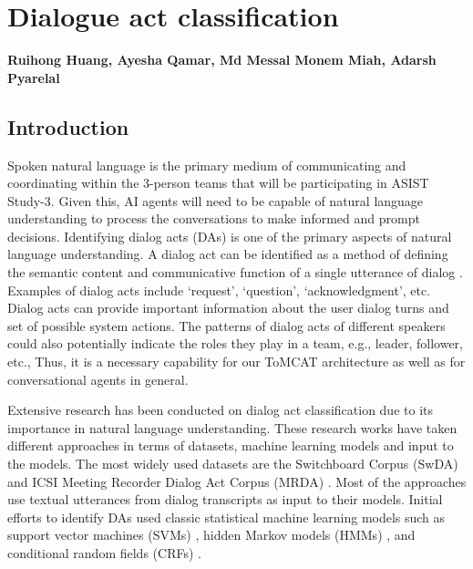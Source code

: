 \chapter{Dialogue act classification}
\label{ch:da_classification}
\textbf{Ruihong Huang, Ayesha Qamar, Md Messal Monem Miah, Adarsh Pyarelal}

\section{Introduction}

Spoken natural language is the primary medium of communicating and coordinating
within the 3-person teams that will be participating in ASIST Study-3.  Given
this, AI agents will need to be capable of natural language understanding to
process the conversations to make informed and prompt decisions. Identifying
dialog acts (DAs) is one of the primary aspects of natural language
understanding. A dialog act can be identified as a method of defining the
semantic content and communicative function of a single utterance of dialog
\citep{Searle:1969}. Examples of dialog acts include `request', `question',
`acknowledgment', etc.
Dialog acts can provide important information about the user dialog turns and
set of possible system actions. The patterns of dialog acts
of different speakers could also potentially indicate the roles they play in a
team, e.g., leader, follower, etc., Thus, it is a necessary capability for our
ToMCAT architecture as well as for conversational agents in general.

Extensive research has been conducted on dialog act classification due to its
importance in natural language understanding. These research works have taken
different approaches in terms of datasets, machine learning models and input to
the models. The most widely used datasets are the Switchboard
Corpus (SwDA) and ICSI Meeting Recorder Dialog Act Corpus (MRDA)
\citep{Shriberg.ea:2004}. Most of the approaches use textual utterances from
dialog transcripts as input to their models. Initial efforts to identify DAs
used classic statistical machine learning models
such as support vector machines (SVMs) \citep{Henderson.ea:2012}, hidden Markov
models (HMMs) \citep{Stolcke.ea:2000}, and conditional random fields (CRFs)
\citep{Zimmermann:2009}.

